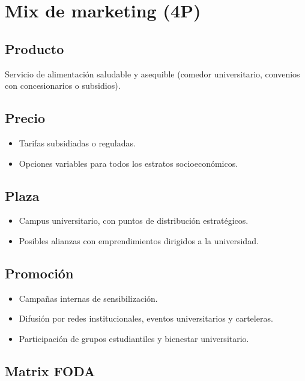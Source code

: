 \documentclass[letterpaper, 11pt]{report}
\begin{document}
\section{Mix de marketing (4P)}

\subsection{Producto}

Servicio de alimentación saludable y asequible (comedor universitario,
convenios con concesionarios o subsidios).

\subsection{Precio}

\begin{itemize}
      \item Tarifas subsidiadas o reguladas.
      \item Opciones variables para todos los estratos socioeconómicos.

\end{itemize}

\subsection{Plaza}

\begin{itemize}
      \item Campus universitario, con puntos de distribución estratégicos.
      \item Posibles alianzas con emprendimientos dirigidos a la universidad.
\end{itemize}

\subsection{Promoción}

\begin{itemize}
      \item Campañas internas de sensibilización.
      \item Difusión por redes institucionales, eventos universitarios y carteleras.
      \item Participación de grupos estudiantiles y bienestar universitario.
\end{itemize}

\subsection{Matrix FODA}
\end{document}
